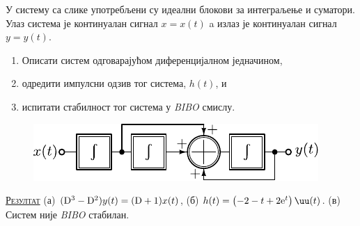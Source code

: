\noindent\PID У систему са слике употребљени су идеални
блокови за интеграљење и суматори. Улаз система  
је континуалан сигнал $x = x(t)$ a излаз је 
континуалан сигнал $y = y(t)$. 
\begin{enumerate}[label=(\alph*)]
    \item Описати 
    систем одговарајућом диференцијалном једначином,
    \item одредити импулсни одзив тог система,  $h(t)$, и
    \item испитати стабилност тог система
    у \textit{BIBO} смислу.
\end{enumerate}
%
\begin{figure}[ht!]
    \centering
    \includegraphics{fig/int_fb.pdf}
    \caption{}
\end{figure}

\vspace*{2mm}

\textsc{\underline{Резултат}} 
(а) $({\rm D}^3 - {\rm D}^2) y(t) = 
({\rm D} + 1) x(t)$, 
\quad
(б) $h(t) = 
\bigl(
-2-t+2{\rm e}^t
\bigr)
\,\uu(t)$.
\quad
(в) Систем није 
\textit{BIBO}
стабилан.
